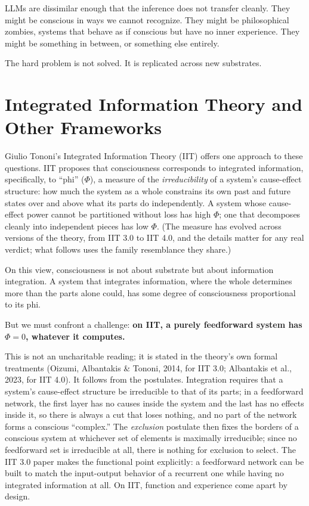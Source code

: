 \documentclass[11pt,letterpaper]{article}
\begin{document}
LLMs are dissimilar enough that the inference does not transfer cleanly. They might be conscious in ways we cannot recognize. They might be philosophical zombies, systems that behave as if conscious but have no inner experience. They might be something in between, or something else entirely.

The hard problem is not solved. It is replicated across new substrates.

\section{Integrated Information Theory and Other Frameworks}

Giulio Tononi's Integrated Information Theory (IIT) offers one approach to these questions. IIT proposes that consciousness corresponds to integrated information, specifically, to ``phi'' ($\Phi$), a measure of the \emph{irreducibility} of a system's cause-effect structure: how much the system as a whole constrains its own past and future states over and above what its parts do independently. A system whose cause-effect power cannot be partitioned without loss has high $\Phi$; one that decomposes cleanly into independent pieces has low $\Phi$. (The measure has evolved across versions of the theory, from IIT 3.0 to IIT 4.0, and the details matter for any real verdict; what follows uses the family resemblance they share.)

On this view, consciousness is not about substrate but about information integration. A system that integrates information, where the whole determines more than the parts alone could, has some degree of consciousness proportional to its phi.

But we must confront a challenge: \textbf{on IIT, a purely feedforward system has $\Phi = 0$, whatever it computes.}

This is not an uncharitable reading; it is stated in the theory's own formal treatments (Oizumi, Albantakis \& Tononi, 2014, for IIT 3.0; Albantakis et al., 2023, for IIT 4.0). It follows from the postulates. Integration requires that a system's cause-effect structure be irreducible to that of its parts; in a feedforward network, the first layer has no causes inside the system and the last has no effects inside it, so there is always a cut that loses nothing, and no part of the network forms a conscious ``complex.'' The \emph{exclusion} postulate then fixes the borders of a conscious system at whichever set of elements is maximally irreducible; since no feedforward set is irreducible at all, there is nothing for exclusion to select. The IIT 3.0 paper makes the functional point explicitly: a feedforward network can be built to match the input-output behavior of a recurrent one while having no integrated information at all. On IIT, function and experience come apart by design.
\end{document}
